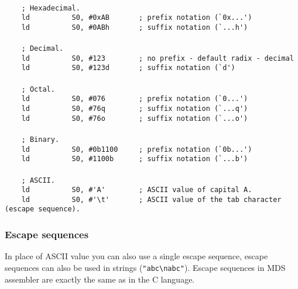         ~\\
        \verb"    ; Hexadecimal."\\
        \verb"    ld          S0, #0xAB       ; prefix notation (`0x...')"\\
        \verb"    ld          S0, #0ABh       ; suffix notation (`...h')"\\
        \verb""\\
        \verb"    ; Decimal."\\
        \verb"    ld          S0, #123        ; no prefix - default radix - decimal"\\
        \verb"    ld          S0, #123d       ; suffix notation (`d')"\\
        \verb""\\
        \verb"    ; Octal."\\
        \verb"    ld          S0, #076        ; prefix notation (`0...')"\\
        \verb"    ld          S0, #76q        ; suffix notation (`...q')"\\
        \verb"    ld          S0, #76o        ; suffix notation (`...o')"\\
        \verb""\\
        \verb"    ; Binary."\\
        \verb"    ld          S0, #0b1100     ; prefix notation (`0b...')"\\
        \verb"    ld          S0, #1100b      ; suffix notation (`...b')"\\
        \verb""\\
        \verb"    ; ASCII."\\
        \verb"    ld          S0, #'A'        ; ASCII value of capital A."\\
        \verb"    ld          S0, #'\t'       ; ASCII value of the tab character (escape sequence)."

        \subsubsection{Escape sequences}
            In place of ASCII value you can also use a single escape sequence, escape sequences can also be used in strings (\verb'"abc\nabc"'). Escape sequences in MDS assembler are exactly the same as in the C language.

